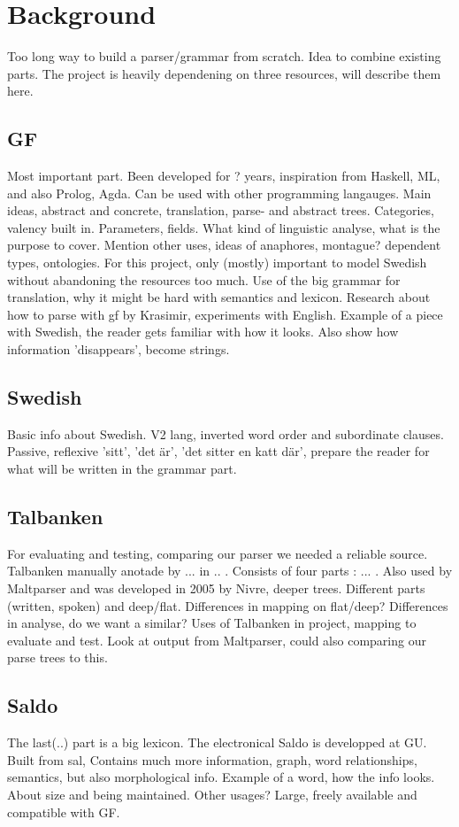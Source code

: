 \documentclass{report}
\begin{document}
\section{Background}  
Too long way to build a parser/grammar from scratch. Idea to combine existing parts. 
The project is heavily dependening on three resources, will describe them here.

\subsection{GF}
Most important part. Been developed for ? years, inspiration from Haskell, ML,
and also Prolog, Agda. Can be used with other programming langauges. 
Main ideas, abstract and concrete, translation, parse- and abstract trees.
Categories, valency built in. Parameters, fields.
What kind of linguistic analyse, what is the purpose to cover. Mention other uses,
ideas of anaphores, montague? dependent types, ontologies.
For this project, only (mostly) important to model Swedish without abandoning the
resources too much. Use of the big grammar for translation, why it might be hard with
semantics and lexicon.
Research about how to parse with gf by Krasimir, experiments with English.
Example of a piece with Swedish, the reader gets familiar with how it looks.
Also show how information 'disappears', become strings.

\subsection{Swedish}
Basic info about Swedish. V2 lang, inverted word order and subordinate clauses.
Passive, reflexive 'sitt', 'det är', 'det sitter en katt där', prepare the reader
for what will be written in the grammar part.


\subsection{Talbanken}
For evaluating and testing, comparing our parser we needed a reliable source.
Talbanken manually anotade by ... in .. . Consists of four parts : ... . 
Also used by Maltparser and was developed in 2005 by Nivre, deeper trees.
Different parts (written, spoken) and deep/flat. Differences in mapping
on flat/deep?
Differences in analyse, do we want a similar? 
Uses of Talbanken in project, mapping to evaluate and test.  
Look at output from Maltparser, could also comparing our parse trees to this.

\subsection{Saldo}
The last(..) part is a big lexicon. The electronical Saldo is developped at GU.
Built from sal,
Contains much more information,
graph, word relationships, semantics, but also morphological info.
Example of a word, how the info looks.
About size and being maintained. Other usages?
Large, freely available and compatible with GF. 
\end{document}
